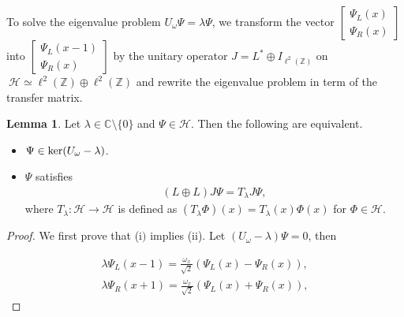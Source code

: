 \documentclass[a4paper,12pt]{article}
\theoremstyle{plain}
\theoremstyle{definition}
\newtheorem{lemma}[thm]{Lemma}
\theoremstyle{definition}
\begin{document}
To solve the eigenvalue problem $U_\omega \Psi =\lambda \Psi$, we transform the vector $\begin{bmatrix}
    \Psi _{L}(x) \\
    \Psi _{R}(x)
\end{bmatrix}$
into $\begin{bmatrix}
    \Psi _{L}(x-1) \\
    \Psi _{R}(x)
\end{bmatrix}$
by the unitary operator 
    $J=L^{*}\oplus I_{\ell^2(\mathbb{Z})}$
    on $\: \mathcal{H} \simeq \ell^2 (\mathbb{Z})\oplus \ell^2 (\mathbb{Z})$
and rewrite the eigenvalue problem in term of the transfer matrix.

\begin{lemma}\label{lemma31}
Let $\lambda \in \mathbb{C}\setminus\{0 \}$ and $\Psi \in \mathcal{H}$. Then the following are equivalent.
\begin{itemize}
\item[(i)] $\Psi \in {\rm ker}(U_{\omega} -\lambda)$.
\item[(ii)] $\Psi$ satisfies
\begin{align}
    (L\oplus L)J\Psi =T_{\lambda}J\Psi \label{31},
\end{align} where $T_{\lambda}:\mathcal{H} \rightarrow \mathcal{H}$ is defined as $(T_{\lambda}\Phi)(x)=T_{\lambda}(x)\Phi(x)$ for $\Phi \in \mathcal{H}$.
\end{itemize}
\begin{proof}
We first prove that ($\mathrm{i})$ implies ($\mathrm{ii}$). Let $(U_{\omega}-\lambda)\Psi=0$, then

\begin{eqnarray}
\label{33}
\lambda \Psi_{L}(x-1) = \frac{\omega_{x}}{\sqrt{2}}(\Psi_{L}(x)-\Psi_{R}(x)),\\
\label{34}
\lambda \Psi_{R}(x+1) = \frac{\omega_{x}}{\sqrt{2}}(\Psi_{L}(x)+\Psi_{R}(x)),
\end{eqnarray}


\end{proof}
\end{lemma}
\end{document}
